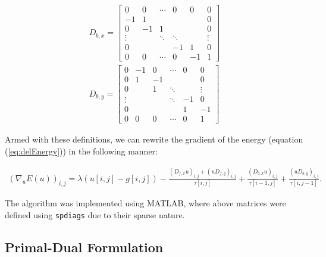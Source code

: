 \documentclass{paper}
\begin{document}
\begin{equation}
\begin{split}
D_{b,x}=
\begin{bmatrix}
  0 & 0 & \cdots & 0 &0 &0 \\
  -1 & 1 & & & &0 \\
  0 & -1 & 1 &  & & 0\\
  \vdots  &  & \ddots & \ddots & &\vdots\\
   0 &  &  & -1 &1 &0 \\
   0 & 0 & \cdots & 0 &-1 &1
  \end{bmatrix} \\
D_{b,y}=
\begin{bmatrix}
  0&-1 & 0 & \cdots & 0 &0\\
  0& 1 & -1 & &  &0 \\
  0&  & 1 & \ddots & &\vdots\\
   \vdots& &  & \ddots & -1 & 0\\  
   0& &  &  & 1 &-1 \\
  0& 0 & 0 & \cdots & 0 &1\end{bmatrix}
\label{eq:backwardDifferences}
\end{split}
\end{equation}

Armed with these definitions, we can rewrite the gradient of the energy (equation (\ref{eq:delEnergy})) in the following manner:

\begin{equation}
\begin{split}
(\nabla_{u}E(u))_{i,j} = \lambda(u[i,j]-g[i,j]) -\frac{(D_{f,x}u)_{i,j}+(u D_{f,y})_{i,j}}{\tau[i,j]} + \frac{(D_{b,x} u)_{i,j}}{\tau[i-1,j]} + \frac{(u D_{b,y})_{i,j}}{\tau[i,j-1]}.
\end{split}
\label{eq:delEnergyMatrices} 
\end{equation}

The algorithm was implemented using MATLAB, where above matrices were defined using \texttt{spdiags} due to their sparse nature.

\subsection{Primal-Dual Formulation}
\end{document}
